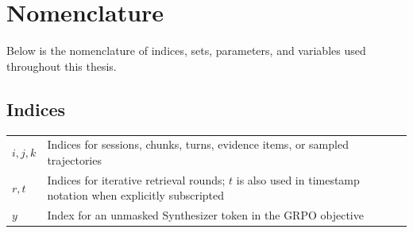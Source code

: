 \thispagestyle{plain}			%

\chapter*{Nomenclature}
Below is the nomenclature of indices, sets, parameters, and variables used throughout this thesis.

\section*{Indices}
\renewcommand*{\arraystretch}{1.35}
\begin{longtable}{p{}p{}}
$i,j,k$ & Indices for sessions, chunks, turns, evidence items, or sampled trajectories\\
$r,t$ & Indices for iterative retrieval rounds; $t$ is also used in timestamp notation when explicitly subscripted\\
$y$ & Index for an unmasked Synthesizer token in the GRPO objective\\
\end{longtable}

